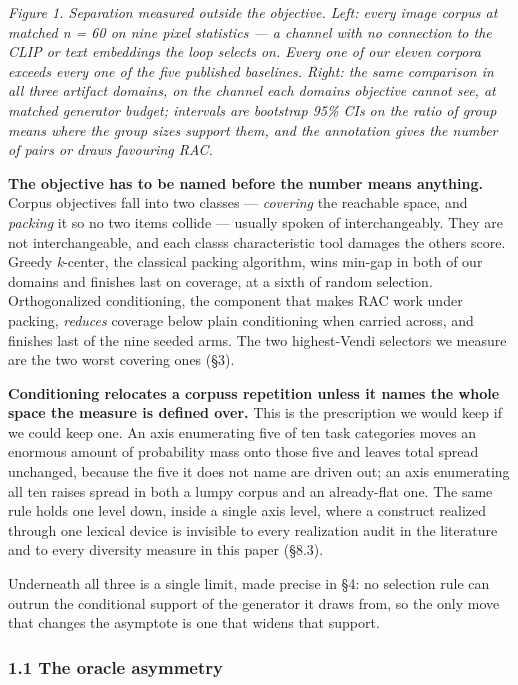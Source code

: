 \documentclass[
  10pt,
]{article}
\theoremstyle{plain}
\theoremstyle{definition}
\begin{document}
\emph{Figure 1. Separation measured outside the objective. Left: every
image corpus at matched n = 60 on nine pixel statistics --- a channel
with no connection to the CLIP or text embeddings the loop selects on.
Every one of our eleven corpora exceeds every one of the five published
baselines. Right: the same comparison in all three artifact domains, on
the channel each domain\textquotesingle s objective cannot see, at
matched generator budget; intervals are bootstrap 95\% CIs on the ratio
of group means where the group sizes support them, and the annotation
gives the number of pairs or draws favouring RAC.}

\textbf{The objective has to be named before the number means anything.}
Corpus objectives fall into two classes --- \emph{covering} the
reachable space, and \emph{packing} it so no two items collide ---
usually spoken of interchangeably. They are not interchangeable, and
each class\textquotesingle s characteristic tool damages the
other\textquotesingle s score. Greedy \emph{k}-center, the classical
packing algorithm, wins min-gap in both of our domains and finishes last
on coverage, at a sixth of random selection. Orthogonalized
conditioning, the component that makes RAC work under packing,
\emph{reduces} coverage below plain conditioning when carried across,
and finishes last of the nine seeded arms. The two highest-Vendi
selectors we measure are the two worst covering ones (§3).

\textbf{Conditioning relocates a corpus\textquotesingle s repetition
unless it names the whole space the measure is defined over.} This is
the prescription we would keep if we could keep one. An axis enumerating
five of ten task categories moves an enormous amount of probability mass
onto those five and leaves total spread unchanged, because the five it
does not name are driven out; an axis enumerating all ten raises spread
in both a lumpy corpus and an already-flat one. The same rule holds one
level down, inside a single axis level, where a construct realized
through one lexical device is invisible to every realization audit in
the literature and to every diversity measure in this paper (§8.3).

Underneath all three is a single limit, made precise in §4: no selection
rule can outrun the conditional support of the generator it draws from,
so the only move that changes the asymptote is one that widens that
support.

\subsubsection{1.1 The oracle asymmetry}\label{11-the-oracle-asymmetry}
\end{document}
